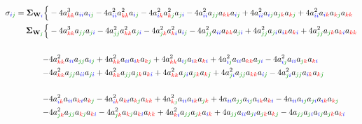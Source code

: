 \documentclass{article}
\begin{document}
\begin{equation}
\begin{aligned}
\sigma_{\idx{i}{j}} = \mathbf{\Sigma}_{\textbf{W}_{\cidx{i}}} \Bigl\{ & -4 a_{\idx{k}{k}}^{3} a_{\idx{i}{i}} a_{\idx{i}{j}} - 4 a_{\idx{i}{i}}^{2} a_{\idx{k}{k}}^{2} a_{\idx{i}{j}} - 4 a_{\idx{i}{k}}^{2} a_{\idx{k}{j}}^{2} a_{\idx{j}{i}} - 4 a_{\idx{i}{i}}^{2} a_{\idx{j}{j}} a_{\idx{k}{k}} a_{\idx{i}{j}} + 4 a_{\idx{i}{i}}^{2} a_{\idx{i}{j}} a_{\idx{j}{k}} a_{\idx{k}{j}} + 4 a_{\idx{i}{i}}^{2} a_{\idx{i}{k}} a_{\idx{k}{j}} a_{\idx{k}{k}} \\
\mathbf{\Sigma}_{\textbf{W}_{\cidx{j}}} \Bigl\{ & -4 a_{\idx{k}{k}}^{3} a_{\idx{j}{j}} a_{\idx{j}{i}} - 4 a_{\idx{j}{j}}^{2} a_{\idx{k}{k}}^{2} a_{\idx{j}{i}} - 4 a_{\idx{j}{k}}^{2} a_{\idx{k}{i}}^{2} a_{\idx{i}{j}} - 4 a_{\idx{j}{j}}^{2} a_{\idx{i}{i}} a_{\idx{k}{k}} a_{\idx{j}{i}} + 4 a_{\idx{j}{j}}^{2} a_{\idx{j}{i}} a_{\idx{i}{k}} a_{\idx{k}{i}} + 4 a_{\idx{j}{j}}^{2} a_{\idx{j}{k}} a_{\idx{k}{i}} a_{\idx{k}{k}} \\
\\
- & 4 a_{\idx{k}{k}}^{2} a_{\idx{i}{i}} a_{\idx{j}{j}} a_{\idx{i}{j}} + 4 a_{\idx{k}{k}}^{2} a_{\idx{i}{i}} a_{\idx{i}{k}} a_{\idx{k}{j}} + 4 a_{\idx{k}{k}}^{2} a_{\idx{i}{j}} a_{\idx{i}{k}} a_{\idx{k}{i}} + 4 a_{\idx{i}{j}}^{2} a_{\idx{i}{i}} a_{\idx{k}{k}} a_{\idx{j}{i}} - 4 a_{\idx{i}{j}}^{2} a_{\idx{i}{i}} a_{\idx{j}{k}} a_{\idx{k}{i}}\\
- & 4 a_{\idx{k}{k}}^{2} a_{\idx{j}{j}} a_{\idx{i}{i}} a_{\idx{j}{i}} + 4 a_{\idx{k}{k}}^{2} a_{\idx{j}{j}} a_{\idx{j}{k}} a_{\idx{k}{i}} + 4 a_{\idx{k}{k}}^{2} a_{\idx{j}{i}} a_{\idx{j}{k}} a_{\idx{k}{j}} + 4 a_{\idx{j}{i}}^{2} a_{\idx{j}{j}} a_{\idx{k}{k}} a_{\idx{i}{j}} - 4a_{\idx{j}{i}}^{2} a_{\idx{j}{j}} a_{\idx{i}{k}} a_{\idx{k}{j}}\\
\\
- & 4 a_{\idx{i}{k}}^{2} a_{\idx{i}{i}} a_{\idx{k}{i}} a_{\idx{k}{j}} - 4 a_{\idx{i}{k}}^{2} a_{\idx{k}{i}} a_{\idx{k}{j}} a_{\idx{k}{k}} + 4 a_{\idx{k}{j}}^{2} a_{\idx{i}{i}} a_{\idx{i}{k}} a_{\idx{j}{k}} + 4 a_{\idx{i}{i}} a_{\idx{j}{j}} a_{\idx{i}{j}} a_{\idx{i}{k}} a_{\idx{k}{i}} - 4 a_{\idx{i}{i}} a_{\idx{i}{j}} a_{\idx{j}{i}} a_{\idx{i}{k}} a_{\idx{k}{j}}\\
- & 4 a_{\idx{j}{k}}^{2} a_{\idx{j}{j}} a_{\idx{k}{j}} a_{\idx{k}{i}} - 4 a_{\idx{j}{k}}^{2} a_{\idx{k}{j}} a_{\idx{k}{i}} a_{\idx{k}{k}} + 4 a_{\idx{k}{i}}^{2} a_{\idx{j}{j}} a_{\idx{j}{k}} a_{\idx{i}{k}} + 4 a_{\idx{j}{j}} a_{\idx{i}{i}} a_{\idx{j}{i}} a_{\idx{j}{k}} a_{\idx{k}{j}} - 4 a_{\idx{j}{j}} a_{\idx{j}{i}}a_{\idx{i}{j}} a_{\idx{j}{k}} a_{\idx{k}{i}}\\

\end{aligned}
\end{equation}
\end{document}
